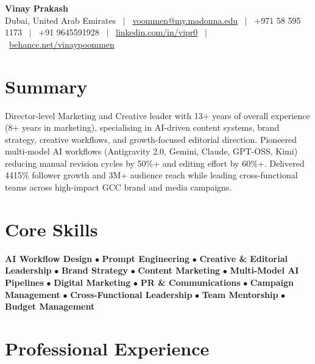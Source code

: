 \documentclass[10.5pt,a4paper]{article}
\begin{document}
\begin{center}
{\LARGE\bfseries Vinay Prakash}\\[0.3em]
\small Dubai, United Arab Emirates \ $|$ \ 
\href{mailto:voommen@my.madonna.edu}{voommen@my.madonna.edu} \ $|$ \ 
+971 58 595 1173 \ $|$ \ 
+91 9645591928 \ $|$ \ 
\href{https://linkedin.com/in/vipr0}{linkedin.com/in/vipr0} \ $|$ \ 
\href{https://behance.net/vinaypoommen}{behance.net/vinaypoommen}
\end{center}
\vspace{-6pt}

\section{Summary}
\small{Director-level Marketing and Creative leader with 13+ years of overall experience (8+ years in marketing), specialising in AI-driven content systems, brand strategy, creative workflows, and growth-focused editorial direction. Pioneered multi-model AI workflows (Antigravity 2.0, Gemini, Claude, GPT-OSS, Kimi) reducing manual revision cycles by 50\%+ and editing effort by 60\%+. Delivered 4415\% follower growth and 3M+ audience reach while leading cross-functional teams across high-impact GCC brand and media campaigns.}

\section{Core Skills}
\small{\textbf{AI Workflow Design} $\bullet$ \textbf{Prompt Engineering} $\bullet$ \textbf{Creative \& Editorial Leadership} $\bullet$ \textbf{Brand Strategy} $\bullet$ \textbf{Content Marketing} $\bullet$ \textbf{Multi-Model AI Pipelines} $\bullet$ \textbf{Digital Marketing} $\bullet$ \textbf{PR \& Communications} $\bullet$ \textbf{Campaign Management} $\bullet$ \textbf{Cross-Functional Leadership} $\bullet$ \textbf{Team Mentorship} $\bullet$ \textbf{Budget Management}}

\section{Professional Experience}
\end{document}

